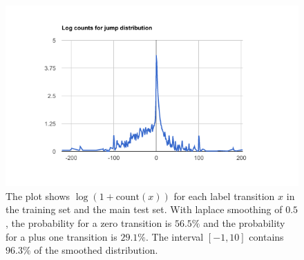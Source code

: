 
\begin{figure}
    \centering
    \includegraphics[scale=0.7]{resources/jump_log_counts.png}
    \caption{The plot shows $\log(1+\text{count}(x))$ for each label transition $x$ in the training set and the main test set. With laplace smoothing of $0.5$, the probability for a zero transition is $56.5\%$ and the probability for a plus one transition is $29.1\%$. The interval $[-1,10]$ contains $96.3\%$ of the smoothed distribution.}
    \label{fig:jump_log_counts}
\end{figure}
